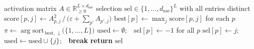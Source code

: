 \begin{algorithm}[H]
\caption{\textsc{ExclusiveSelect}: per-position feature assignment.}
\label{alg:exclusive}
\small
\begin{algorithmic}[1]
\REQUIRE activation matrix $A\in\mathbb{R}_{\geq 0}^{L\times d_{\text{sae}}}$
\ENSURE  selection $\mathrm{sel}\in\{1,\ldots,d_{\text{sae}}\}^L$ with all entries distinct
\STATE $\mathrm{score}[p,j] \gets A_{p,j}^2 \,\big/\, \bigl(\varepsilon + \sum_{p'} A_{p',j}\bigr)$
\STATE $\mathrm{best}[p] \gets \max_j \mathrm{score}[p, j]$ for each $p$
\STATE $\pi \gets \arg\!\mathrm{sort}_{\,\mathrm{best},\,\downarrow}\bigl(\{1,\ldots,L\}\bigr)$
\STATE $\mathrm{used} \gets \emptyset$;\ \ $\mathrm{sel}[p] \gets -1$ for all $p$
            \STATE $\mathrm{sel}[p] \gets j$;\ \ $\mathrm{used} \gets \mathrm{used} \cup \{j\}$;\ \ \textbf{break}
        \ENDIF
    \ENDFOR
\ENDFOR
\STATE \textbf{return} $\mathrm{sel}$
\end{algorithmic}
\end{algorithm}
